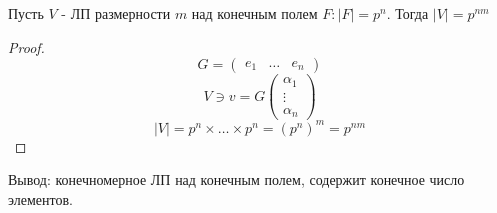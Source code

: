 \begin{note}
Пусть $V$ - ЛП размерности $m$ над конечным полем $F \colon \left|F\right| = p ^{n}$. Тогда $\left|V\right| = p ^{nm}$
\end{note}
\begin{proof}
  \[
    G = \begin{pmatrix} e_1 & \ldots & e_n\end{pmatrix}
  \]
  \[
  V \ni v = G \begin{pmatrix}\alpha_1 \\ \vdots \\ \alpha_n \end{pmatrix}
  \]
  \[
  \left|V\right| = p ^{n} \times \ldots \times p ^{n} = (p ^{n})^{m} = p ^{nm}
  \]
\end{proof}
Вывод: конечномерное ЛП над конечным полем, содержит конечное число элементов.
